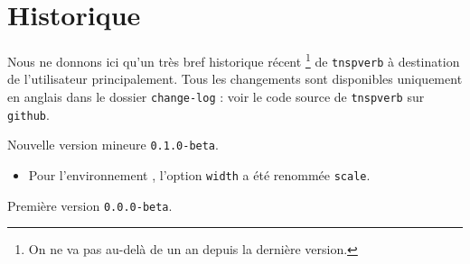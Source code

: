 \documentclass[12pt,a4paper]{article}
\begin{document}
\newpage

\section{Historique}

Nous ne donnons ici qu'un très bref historique récent
\footnote{
	On ne va pas au-delà de un an depuis la dernière version.
}
de \verb+tnspverb+ à destination de l'utilisateur principalement.
Tous les changements sont disponibles uniquement en anglais dans le dossier \verb+change-log+ : voir le code source de \verb+tnspverb+ sur \verb+github+.

\begin{description}

    \medskip
    \item[2020-10-25] Nouvelle version mineure \verb+0.1.0-beta+.
    
    \begin{itemize}[itemsep=.5em]
        \item Pour l'environnement , l'option \verb#width# a été renommée \verb#scale#.
    
    
    \end{itemize}
    
    \separation


    \medskip
    \item[2020-09-06] Première version \verb+0.0.0-beta+.


\end{description}
\end{document}

